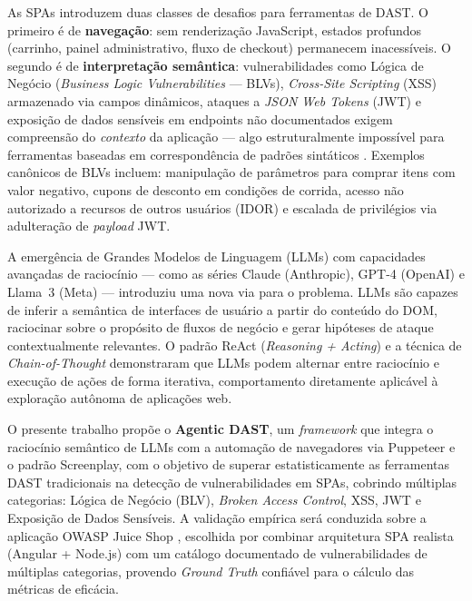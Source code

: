 \documentclass[
    12pt,
    openany,
    oneside,
    a4paper,
    brazil
]{abntex2}
\begin{document}
As SPAs introduzem duas classes de desafios para ferramentas de DAST.
O primeiro é de \textbf{navegação}: sem renderização JavaScript, estados
profundos (carrinho, painel administrativo, fluxo de checkout) permanecem
inacessíveis. O segundo é de \textbf{interpretação semântica}: vulnerabilidades
como Lógica de Negócio (\textit{Business Logic Vulnerabilities} --- BLVs),
\textit{Cross-Site Scripting} (XSS) armazenado via campos dinâmicos,
ataques a \textit{JSON Web Tokens} (JWT) e exposição de dados sensíveis
em endpoints não documentados exigem compreensão do \textit{contexto} da
aplicação --- algo estruturalmente impossível para ferramentas baseadas em
correspondência de padrões sintáticos \cite{karadbhajne2025,portswigger2024}.
Exemplos canônicos de BLVs incluem: manipulação de parâmetros para comprar
itens com valor negativo, cupons de desconto em condições de corrida,
acesso não autorizado a recursos de outros usuários (IDOR) e escalada de
privilégios via adulteração de \textit{payload} JWT.

A emergência de Grandes Modelos de Linguagem (LLMs) com capacidades
avançadas de raciocínio --- como as séries Claude (Anthropic), GPT-4
(OpenAI) e Llama~3 (Meta) --- introduziu uma nova via para o problema.
LLMs são capazes de inferir a semântica de interfaces de usuário a
partir do conteúdo do DOM, raciocinar sobre o propósito de fluxos de
negócio e gerar hipóteses de ataque contextualmente relevantes. O
padrão ReAct (\textit{Reasoning + Acting}) \cite{yao2023react} e a
técnica de \textit{Chain-of-Thought} \cite{wei2022chain} demonstraram
que LLMs podem alternar entre raciocínio e execução de ações de forma
iterativa, comportamento diretamente aplicável à exploração autônoma de
aplicações web.

O presente trabalho propõe o \textbf{Agentic DAST}, um
\textit{framework} que integra o raciocínio semântico de LLMs com a
automação de navegadores via Puppeteer e o padrão Screenplay, com o
objetivo de superar estatisticamente as ferramentas DAST tradicionais
na detecção de vulnerabilidades em SPAs, cobrindo múltiplas categorias:
Lógica de Negócio (BLV), \textit{Broken Access Control}, XSS, JWT e
Exposição de Dados Sensíveis. A validação empírica será conduzida sobre
a aplicação OWASP Juice Shop \cite{owaspjuiceshop}, escolhida por combinar
arquitetura SPA realista (Angular + Node.js) com um catálogo documentado
de vulnerabilidades de múltiplas categorias, provendo \textit{Ground Truth}
confiável para o cálculo das métricas de eficácia.

\end{document}
